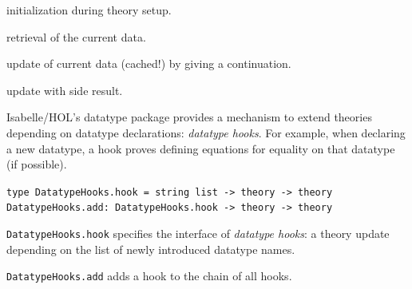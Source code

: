 \begin{isabellebody}
\begin{isamarkuptext}
  \begin{description}

  \item {} initialization during theory setup.

  \item {} retrieval of the current data.

  \item {} update of current data (cached!)
    by giving a continuation.

  \item {} update with side result.

  \end{description}%
\end{isamarkuptext}%
\isamarkuptrue%
%
\isamarkuptrue%
%
\begin{isamarkuptext}%
Isabelle/HOL's datatype package provides a mechanism to
  extend theories depending on datatype declarations:
  \emph{datatype hooks}.  For example, when declaring a new
  datatype, a hook proves defining equations for equality on
  that datatype (if possible).%
\end{isamarkuptext}%
\isamarkuptrue%
%
\isadelimmlref
%
\endisadelimmlref
%
\isatagmlref
%
\begin{isamarkuptext}%
\begin{mldecls}
  \verb|type DatatypeHooks.hook = string list -> theory -> theory| \\
  \verb|DatatypeHooks.add: DatatypeHooks.hook -> theory -> theory|
  \end{mldecls}

  \begin{description}

  \item \verb|DatatypeHooks.hook| specifies the interface
     of \emph{datatype hooks}: a theory update
     depending on the list of newly introduced
     datatype names.

  \item \verb|DatatypeHooks.add| adds a hook to the
     chain of all hooks.


\end{description}
\end{isamarkuptext}
\end{isabellebody}
